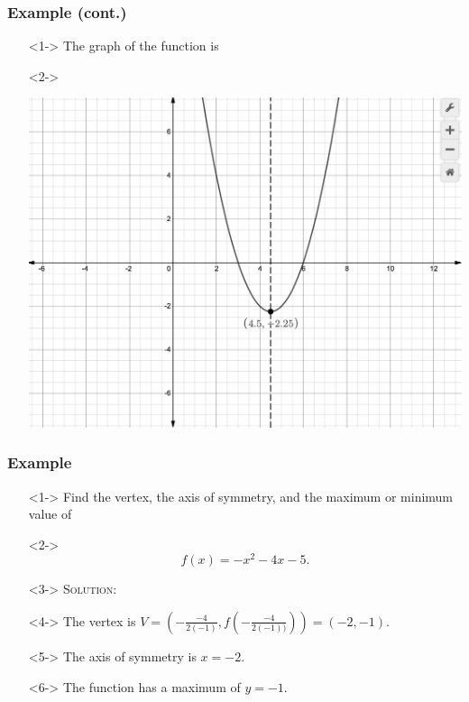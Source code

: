 \documentclass[handout]{beamer}
\begin{document}
\begin{frame}
	\frametitle{Example (cont.)}
	\begin{enumerate}
		\item[]<1-> The graph of the function is
		\item[]<2->\begin{center}
				\includegraphics[scale=0.25]{3_3_6.png}
			\end{center}
	\end{enumerate}
\end{frame}

\begin{frame}
	\frametitle{Example}
	\begin{enumerate}
		\item[]<1-> Find the vertex, the axis of symmetry, and the maximum or minimum value of
		\item[]<2->\[ f(x)=-x^{2}-4x-5. \]
		\item[]<3-> \textsc{Solution:}
		\item[]<4-> The vertex is $V=\left( -\frac{-4}{2(-1)}, f \left( -\frac{-4}{2(-1))} \right)\right)=\left( -2,  -1 \right)$.
		\item[]<5-> The axis of symmetry is $x=-2$.
		\item[]<6-> The function has a maximum of $y=-1$.
	\end{enumerate}
\end{frame}
\end{document}
